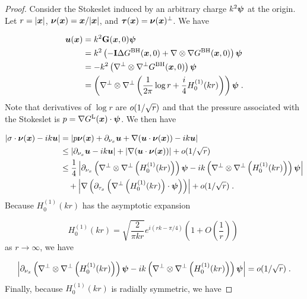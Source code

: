 \begin{proof}
Consider the Stokeslet induced by an arbitrary charge
$k^2 {\boldsymbol \psi}$ at the origin. Let $r = |{\boldsymbol x}|$,
${\boldsymbol \nu}({\boldsymbol x}) = {\boldsymbol x}/|{\boldsymbol x}|$, and ${\boldsymbol \tau}({\boldsymbol x}) = {\boldsymbol \nu}({\boldsymbol x})^\perp$. We have

\begin{align*}
{\boldsymbol u} ({\boldsymbol x}) &= k^2 {\bf G}({\boldsymbol x},0) {\boldsymbol \psi} \\
&= k^2 \left (-{\bf I} \Delta G^{\textrm{BH}}({\boldsymbol x},0)
+ \nabla \otimes \nabla G^{\textrm{BH}}({\boldsymbol x},0)\right ) {\boldsymbol \psi} \\
&= -k^2 \left (\nabla^\perp \otimes \nabla^\perp G^{\textrm{BH}}({\boldsymbol x},0) \right) {\boldsymbol \psi} \\
&= \left(\nabla^\perp \otimes \nabla^\perp \left ( \frac{1}{2\pi}
\log r + \frac{i}{4} H_0^{(1)} (kr) \right ) \right){\boldsymbol \psi} \; .
\end{align*}
Note that derivatives of $\log r$ are $o (1/\sqrt{r})$
and that the pressure associated with the Stokeslet is
$p = \nabla G^{\textrm{L}}({\boldsymbol x}) \cdot {\boldsymbol \psi}$. We then have

\begin{align*}
\left | \sigma \cdot {\boldsymbol \nu}({\boldsymbol x}) - i k {\boldsymbol u} \right | &=
\left | p {\boldsymbol \nu}({\boldsymbol x}) + \partial_{{\nu_x}} {\boldsymbol u} + \nabla ({\boldsymbol u} \cdot {\boldsymbol \nu}({\boldsymbol x}))
- ik {\boldsymbol u} \right | \\
&\leq \left | \partial_{{\nu_x}} {\boldsymbol u} - ik{\boldsymbol u} \right | + \left | \nabla({\boldsymbol u} \cdot {\boldsymbol \nu}({\boldsymbol x})) \right |
+ o (1/\sqrt{r}) \\
&\leq \frac{1}{4} \left | \partial_{{\nu_x}} \left(\nabla^\perp \otimes
\nabla^\perp \left (H_0^{(1)} (kr) \right ) \right){\boldsymbol \psi}
- i k \left(\nabla^\perp \otimes \nabla^\perp
\left (H_0^{(1)} (kr) \right ) \right){\boldsymbol \psi} \right | \\
& \quad + \left | \nabla \left( \partial_{\tau_x} \left ( 
\nabla^\perp \left (H_0^{(1)} (kr) \right ) \cdot {\boldsymbol \psi}  \right )
\right) \right | + o (1/\sqrt{r}) \; .
\end{align*}
Because $H_0^{(1)}(kr)$ has the asymptotic expansion 

\begin{equation}
H_0^{(1)}(kr) = \sqrt{\frac{2}{\pi k r}} e^{i(rk-\pi/4)} \left ( 1 + O\left (
\frac{1}{r} \right ) \right ) \; \nonumber
\end{equation}
as $r\to \infty$, we have

\begin{equation}
\left | \partial_{{\nu_x}} \left(\nabla^\perp \otimes
\nabla^\perp \left (H_0^{(1)} (kr) \right ) \right){\boldsymbol \psi}
- ik \left(\nabla^\perp \otimes \nabla^\perp
\left (H_0^{(1)} (kr) \right ) \right){\boldsymbol \psi} \right | =
o ( 1/\sqrt{r} ) \; . \nonumber
\end{equation}
Finally, because $H_0^{(1)}(kr)$ is radially symmetric,
we have


\end{proof}
